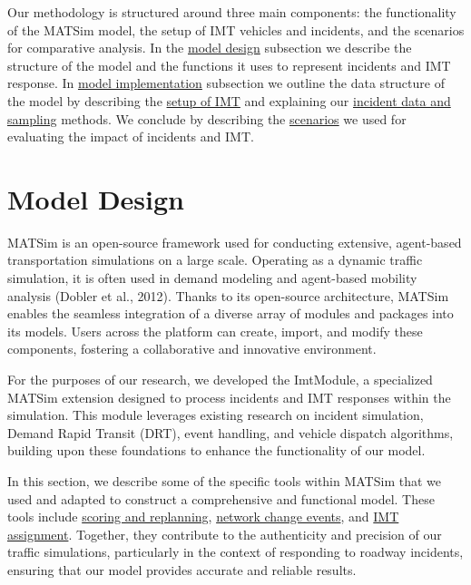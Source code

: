 \documentclass[fancy, oneside, mastersfancy, ms]{byuthesis}
\begin{document}
Our methodology is structured around three main components: the
functionality of the MATSim model, the setup of IMT vehicles and
incidents, and the scenarios for comparative analysis. In the
\protect\hyperlink{sec-MATSim_mod}{model design} subsection we describe
the structure of the model and the functions it uses to represent
incidents and IMT response. In \protect\hyperlink{sec-model_imp}{model
implementation} subsection we outline the data structure of the model by
describing the \protect\hyperlink{sec-IMT_setup}{setup of IMT} and
explaining our \protect\hyperlink{sec-inc_data}{incident data and
sampling} methods. We conclude by describing the
\protect\hyperlink{sec-scenarios}{scenarios} we used for evaluating the
impact of incidents and IMT.

\hypertarget{sec-MATSim_mod}{%
\section{Model Design}\label{sec-MATSim_mod}}

MATSim is an open-source framework used for conducting extensive,
agent-based transportation simulations on a large scale. Operating as a
dynamic traffic simulation, it is often used in demand modeling and
agent-based mobility analysis (Dobler et al., 2012). Thanks to its
open-source architecture, MATSim enables the seamless integration of a
diverse array of modules and packages into its models. Users across the
platform can create, import, and modify these components, fostering a
collaborative and innovative environment.

For the purposes of our research, we developed the ImtModule, a
specialized MATSim extension designed to process incidents and IMT
responses within the simulation. This module leverages existing research
on incident simulation, Demand Rapid Transit (DRT), event handling, and
vehicle dispatch algorithms, building upon these foundations to enhance
the functionality of our model.

In this section, we describe some of the specific tools within MATSim
that we used and adapted to construct a comprehensive and functional
model. These tools include \protect\hyperlink{sec-MATSim_score}{scoring
and replanning}, \protect\hyperlink{sec-NCE}{network change events}, and
\protect\hyperlink{sec-imt_response}{IMT assignment}. Together, they
contribute to the authenticity and precision of our traffic simulations,
particularly in the context of responding to roadway incidents, ensuring
that our model provides accurate and reliable results.
\end{document}
